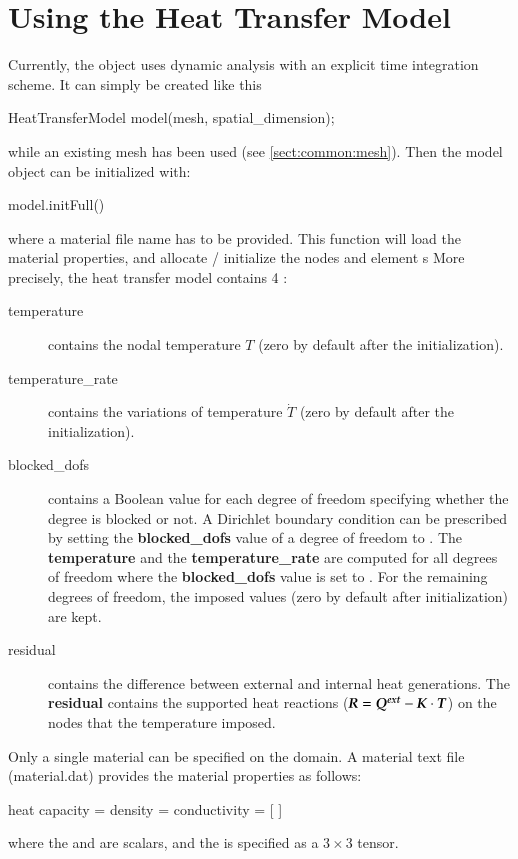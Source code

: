 \section{Using the Heat Transfer Model}
Currently, the  object uses dynamic analysis
with an explicit time integration scheme.  It can simply be created
like this
\begin{cpp}
  HeatTransferModel model(mesh, spatial_dimension);
\end{cpp}
while an existing mesh has been used (see \ref{sect:common:mesh}).
Then the model object can be initialized with:
\begin{cpp}
  model.initFull()
\end{cpp}
where a material file name has to be provided. This function will load the material
properties, and allocate / initialize the nodes and element s
More precisely, the heat transfer model contains 4 :
\begin{description}
\item[temperature] contains the nodal temperature $T$ (zero  by   default  after  the
  initialization).
\item[temperature\_rate] contains the variations of temperature $\dot{T}$
  (zero  by   default  after  the
  initialization).

\item[blocked\_dofs] contains a Boolean value for each degree of
  freedom specifying whether the degree is blocked or not. A Dirichlet
  boundary condition can be prescribed by setting the
  \textbf{blocked\_dofs} value of a degree of freedom to .
  The \textbf{temperature} and the \textbf{temperature\_rate} are
  computed for all degrees of freedom where the \textbf{blocked\_dofs}
  value is set to .  For the remaining degrees of freedom,
  the imposed values (zero by default after initialization) are kept.

\item[residual] contains the difference between external and internal heat generations.
The \textbf{residual} contains the supported heat reactions ($\boldsymbol{R} = \boldsymbol{Q^{ext}} -\boldsymbol{K} \cdot \boldsymbol{T}$) on
  the nodes that the temperature imposed.
\end{description}

Only a single material can be specified on the domain.
A material text file (\eg material.dat) provides the material properties as follows:
\begin{cpp}
  heat %
  capacity = %
  density = %
  conductivity = [%
  ]
\end{cpp}
where the  and  are scalars, and the  is specified as a $3\times 3$ tensor.

